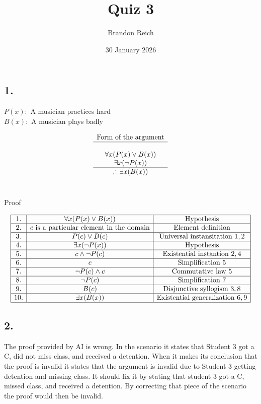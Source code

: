 \documentclass{article}
\title{Quiz 3}
\author{Brandon Reich}
\date{30 January 2026}
\begin{document}
\maketitle

\subsection*{1.}
$P(x):$ A musician practices hard \\
$B(x):$ A musician plays badly

$$
\begin{array}{c}
    \text{Form of the argument} \\
    \hline \\
    \forall x(P(x) \lor B(x)) \\
    \exists x(\neg P(x)) \\
    \hline
    \therefore \exists x(B(x)) \\
\end{array}
$$
\\
\begin{center}
Proof
\end{center}
$$
\begin{array}{|c|c|c|}
    \hline
    1. & \forall x(P(x) \lor B(x)) & \text{Hypothesis} \\
    \hline
    2. & c \text{ is a particular element in the domain} & \text{Element definition} \\
    \hline
    3. & P(c) \lor B(c) & \text{Universal instansitation } 1,2 \\
    \hline
    4. & \exists x(\neg P(x)) & \text{Hypothesis} \\
    \hline
    5. & c \land \neg P(c) & \text{Existential instantion } 2,4 \\
    \hline
    6. & c & \text{Simplification } 5 \\
    \hline
    7. & \neg P(c) \land c & \text{Commutative law } 5\\
    \hline
    8. & \neg P(c) & \text{Simplification } 7 \\
    \hline
    9. & B(c) & \text{Disjunctive syllogism } 3,8 \\
    \hline
    10. & \exists x(B(x)) & \text{Existential generalization } 6, 9 \\
    \hline
\end{array}
$$

\subsection*{2.}

The proof provided by AI is wrong. In the scenario it states that Student 3 got a C, did not miss class, and received a detention. When it makes its conclusion that the proof is invalid it states that the argument is invalid due to Student 3 getting detention and missing class. It should fix it by stating that student 3 got a C, missed class, and received a detention. By correcting that piece of the scenario the proof would then be invalid.
\end{document}
